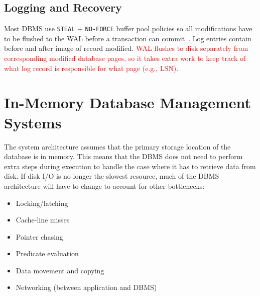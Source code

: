 \documentclass[11pt]{article}
\newcommand{\rr}[1]{\textcolor{red}{#1}}
\begin{document}

\subsection*{Logging and Recovery}
Most DBMS use \texttt{STEAL} + \texttt{NO-FORCE} buffer pool policies so all modifications 
have to be flushed to the WAL before a transaction can commit~\cite{franklin14}.
Log entries contain before and after image of record modified. \rr{WAL flushes to disk separately
from corresponding modified database pages, so it takes extra work to keep track of what log record is
responsible for what page (e.g., LSN).}


\section{In-Memory Database Management Systems}
The system architecture assumes that the primary storage location of the database is in 
memory. This means that the DBMS does not need to perform extra steps during execution to 
handle the case where it has to retrieve data from disk.
If disk I/O is no longer the slowest resource, much of the DBMS architecture will have to 
change to account for other bottlenecks:~\cite{stonebraker2007}
\begin{itemize}
    \item Locking/latching
    \item Cache-line misses
    \item Pointer chasing
    \item Predicate evaluation
    \item Data movement and copying
    \item Networking (between application and DBMS)
\end{itemize}
    
\end{document}
